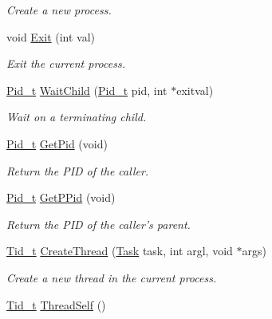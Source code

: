 \begin{DoxyCompactItemize}
\begin{DoxyCompactList}\small\item\em Create a new process. \end{DoxyCompactList}\item 
void \hyperlink{group__syscalls_gabed0249344c12ecd4f8d440fc05a360a}{Exit} (int val)
\begin{DoxyCompactList}\small\item\em Exit the current process. \end{DoxyCompactList}\item 
\hyperlink{group__syscalls_gafac07f3170763932fac97b6eab2c3984}{Pid\-\_\-t} \hyperlink{group__syscalls_ga37017afba05480740d26b033975fef03}{Wait\-Child} (\hyperlink{group__syscalls_gafac07f3170763932fac97b6eab2c3984}{Pid\-\_\-t} pid, int $\ast$exitval)
\begin{DoxyCompactList}\small\item\em Wait on a terminating child. \end{DoxyCompactList}\item 
\hyperlink{group__syscalls_gafac07f3170763932fac97b6eab2c3984}{Pid\-\_\-t} \hyperlink{group__syscalls_ga5106ac1f078c5dde2d6fea3881c1a4fb}{Get\-Pid} (void)
\begin{DoxyCompactList}\small\item\em Return the P\-I\-D of the caller. \end{DoxyCompactList}\item 
\hyperlink{group__syscalls_gafac07f3170763932fac97b6eab2c3984}{Pid\-\_\-t} \hyperlink{group__syscalls_ga33ccb3f7c80d85e610206c0e1150657b}{Get\-P\-Pid} (void)
\begin{DoxyCompactList}\small\item\em Return the P\-I\-D of the caller's parent. \end{DoxyCompactList}\item 
\hyperlink{group__syscalls_gaf67ad1c55e6b2a79bf8a99106380ce01}{Tid\-\_\-t} \hyperlink{group__syscalls_ga284070b5fddcc3653e146e63fcbfe6e3}{Create\-Thread} (\hyperlink{group__syscalls_ga0c7678964128d7fccc9ce98528494f4a}{Task} task, int argl, void $\ast$args)
\begin{DoxyCompactList}\small\item\em Create a new thread in the current process. \end{DoxyCompactList}\item 
\hypertarget{group__syscalls_ga75ffeb50fda6297110a2f07ef94d285c}{\hyperlink{group__syscalls_gaf67ad1c55e6b2a79bf8a99106380ce01}{Tid\-\_\-t} \hyperlink{group__syscalls_ga75ffeb50fda6297110a2f07ef94d285c}{Thread\-Self} ()}\label{group__syscalls_ga75ffeb50fda6297110a2f07ef94d285c}


\end{DoxyCompactItemize}
